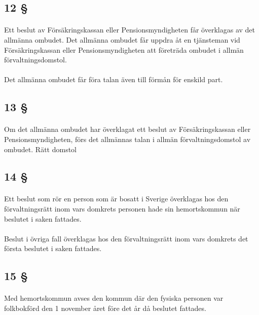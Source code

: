 \documentclass[a4paper,notitlepage,openany,10pt]{book}
\begin{document}
\subsection*{12 §}
\paragraph*{}
Ett beslut av Försäkringskassan eller Pensionsmyndigheten får överklagas av det allmänna ombudet.
Det allmänna ombudet får uppdra åt en tjänsteman vid Försäkringskassan eller Pensionsmyndigheten att företräda ombudet i allmän förvaltningsdomstol.
\paragraph*{}
Det allmänna ombudet får föra talan även till förmån för enskild part.
\subsection*{13 §}
\paragraph*{}
Om det allmänna ombudet har överklagat ett beslut av Försäkringskassan eller Pensionsmyndigheten, förs det allmännas talan i allmän förvaltningsdomstol av ombudet.
Rätt domstol
\subsection*{14 §}
\paragraph*{}
Ett beslut som rör en person som är bosatt i Sverige överklagas hos den förvaltningsrätt inom vars domkrets personen hade sin hemortskommun när beslutet i saken fattades.
\paragraph*{}
Beslut i övriga fall överklagas hos den förvaltningsrätt inom vars domkrets det första beslutet i saken fattades.
\subsection*{15 §}
\paragraph*{}
Med hemortskommun avses den kommun där den fysiska personen var folkbokförd den 1 november året före det år då beslutet fattades.
\end{document}
